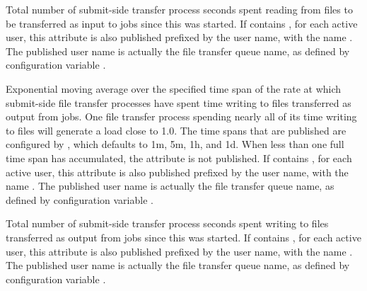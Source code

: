 \begin{description}
\item[\AdAttr{FileTransferFileReadSeconds}] Total number of
  submit-side transfer process seconds spent reading from files to be
  transferred as input to jobs since this  was started.
  If  contains ,
  for each active user, this attribute is also published prefixed by
  the user name, with the name
  .
  The published user name is actually the file transfer queue name, as
  defined by configuration variable .

\item[\AdAttr{FileTransferFileWriteLoad\_<timespan>}]
  Exponential moving average over the specified time span of the rate
  at which submit-side file transfer processes have spent time writing to files
  transferred as output from jobs.  One file transfer process spending
  nearly all of its time writing to files will generate a load close
  to 1.0.
  The time spans that are published are configured by
  , which defaults to
  1m, 5m, 1h, and 1d.  When less than one full time span has
  accumulated, the attribute is not published.
  If  contains ,
  for each active user, this attribute is also published prefixed by
  the user name, with the name
  .
  The published user name is actually the file transfer queue name, as
  defined by configuration variable .

\item[\AdAttr{FileTransferFileWriteSeconds}] Total number of
  submit-side transfer process seconds spent writing to files
  transferred as output from jobs since this  was
  started.
  If  contains ,
  for each active user, this attribute is also published prefixed by
  the user name, with the name
  .
  The published user name is actually the file transfer queue name, as
  defined by configuration variable .


\end{description}
